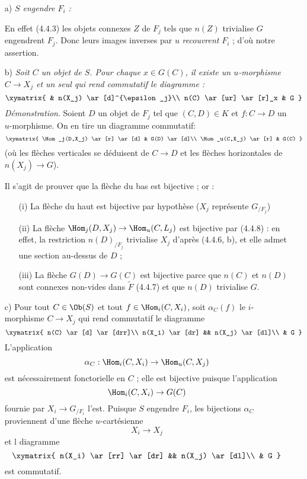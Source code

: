 \begin{enumerate}
    \item[a)] \emph{$S$ engendre $F_i$ :}
    
    En effet (4.4.3) les objets connexes $Z$ de $F_j$ tels que $n(Z)$ trivialise $G$ engendrent $F_j$. Donc leurs images inverses par $u$ \emph{recouvrent} $F_i$ ; d'où notre assertion.
    \item[b)] \emph{Soit $C$ un objet de $S$. Pour chaque $x \in G(C)$, il existe un $u$-morphisme $C \to X_j$ et un seul qui rend commutatif le diagramme :}
    $$
    \xymatrix{
        & n(X_j) \ar[d]^{\epsilon_j}\\
        n(C) \ar[ur] \ar[r]_x & G
    }
    $$
    {\it Démonstration}. Soient $D$ un objet de $F_j$ tel que $(C, D) \in K$ et $f: C \to D$ un $u$-morphisme. On en tire un diagramme commutatif:
$$
    \xymatrix{
        \Hom_j(D,X_j) \ar[r] \ar[d] & G(D) \ar[d]\\
        \Hom_u(C,X_j) \ar[r] & G(C)
    }  
$$
(où les flèches verticales se déduisent de $C \to D$ et les flèches horizontales de $n(X_j) \to G$).

Il s'agit de prouver que la flèche du bas est bijective ; or :
\begin{enumerate}
    \item[(i)] La flèche du haut est bijective par hypothèse ($X_j$ représente $G_{/F_j}$)
    \item[(ii)] La flèche $\Hom_j(D, X_j) \to \Hom_u(C, L_j)$ est bijective par (4.4.8) : en effet, la restriction $n(D)_{/F_j}$ trivialise $X_j$ d'après (4.4.6, b), et elle admet une section au-dessus de $D$ ;
    \item[(iii)] La flèche $G(D) \to G(C)$ est bijective parce que $n(C)$ et $n(D)$ sont connexes non-vides dans $\widetilde{F}$ (4.4.7) et que $n(D)$ trivialise $G$.
\end{enumerate}
    \item[c)] Pour tout $C \in \Ob(S)$ et tout $f \in \Hom_i(C, X_i)$, soit $\alpha_C(f)$ le $i$-morphisme $C \to X_j$ qui rend commutatif le diagramme
    $$
    \xymatrix{
        n(C) \ar[d] \ar[drr]\\
        n(X_i) \ar[dr] && n(X_j) \ar[dl]\\
        & G
    }
    $$
    L'application 
    $$
    \alpha_C: \Hom_i(C, X_i) \to \Hom_u(C, X_j)
    $$
    est nécessairement fonctorielle en $C$ ; elle est bijective puisque l'application
    $$
    \Hom_i(C, X_i) \to G(C)
    $$
    fournie par $X_i \to G_{/F_i}$ l'est. Puisque $S$ engendre $F_i$, les bijections $\alpha_C$ proviennent d'une flèche $u$-cartésienne
    $$
    X_i \to X_j
    $$
    et l diagramme
    $$
    \xymatrix{
        n(X_i) \ar[rr] \ar[dr] && n(X_j) \ar[dl]\\
        & G
    }
    $$
    est commutatif.
\end{enumerate}

